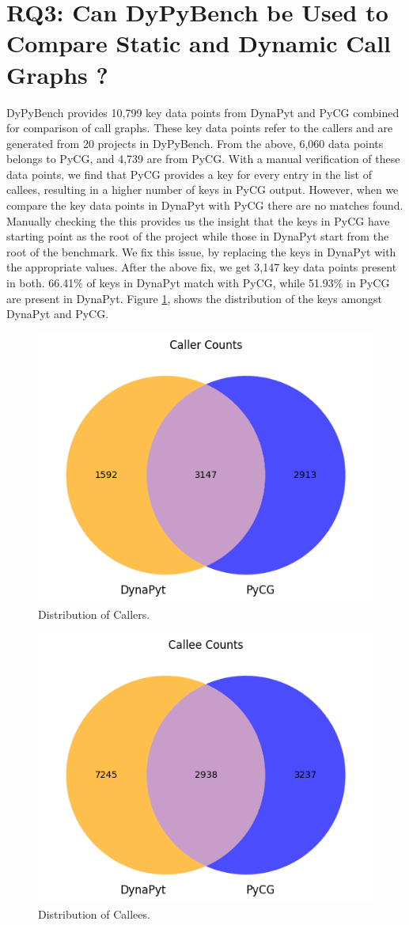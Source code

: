 \section{RQ3: Can DyPyBench be Used to Compare Static and Dynamic Call Graphs ? }

DyPyBench provides 10,799 key data points from DynaPyt and PyCG combined for comparison of call graphs.
These key data points refer to the callers and are generated from 20 projects in DyPyBench.
From the above, 6,060 data points belongs to PyCG, and 4,739 are from PyCG.
With a manual verification of these data points, we find that PyCG provides a key for every entry in the list of callees, resulting in a higher number of keys in PyCG output.
However, when we compare the key data points in DynaPyt with PyCG there are no matches found.
Manually checking the this provides us the insight that the keys in PyCG have starting point as the root of the project while those in DynaPyt start from the root of the benchmark.
We fix this issue, by replacing the keys in DynaPyt with the appropriate values.
After the above fix, we get 3,147 key data points present in both.
66.41\% of keys in DynaPyt match with PyCG, while 51.93\% in PyCG are present in DynaPyt.
Figure \ref{fig:caller counts}, shows the distribution of the keys amongst DynaPyt and PyCG.
\begin{figure}[ht]
    \centering
    \includegraphics[width=0.5\linewidth]{figures/evaluation/callercounts.png}
    \caption[Distribution of Callers]{\label{fig:caller counts}Distribution of Callers. }
\end{figure}
\begin{figure}[ht]
    \centering
    \includegraphics[width=0.5\linewidth]{figures/evaluation/calleecounts.png}
    \caption[Distribution of Callees]{\label{fig:callee_counts}Distribution of Callees.}
\end{figure}


